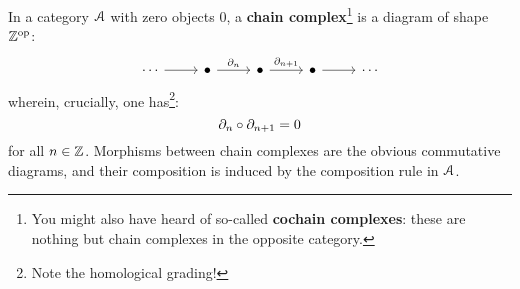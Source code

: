                    \begin{example} \label{example: chain_complexes}
                        In a category $\mathcal{A}$ with zero objects $0$, a \textbf{chain complex}\footnote{You might also have heard of so-called \textbf{cochain complexes}: these are nothing but chain complexes in the opposite category.} is a diagram of shape $\mathbb{Z}^{\mathrm{op}}$:
                            $$
                                \begin{tikzcd}
                                	{\cdots} & \bullet & \bullet & \bullet & {\cdots}
                                	\arrow[from=1-1, to=1-2]
                                	\arrow["{\del_n}", from=1-2, to=1-3]
                                	\arrow["{\del_{n + 1}}", from=1-3, to=1-4]
                                	\arrow[from=1-4, to=1-5]
                                \end{tikzcd}
                            $$
                        wherein, crucially, one has\footnote{Note the homological grading!}:
                            $$\partial_n \circ \partial_{n + 1} = 0$$
                        for all $n \in \mathbb{Z}$. Morphisms between chain complexes are the obvious commutative diagrams, and their composition is induced by the composition rule in $\mathcal{A}$.
                        

\end{example}
